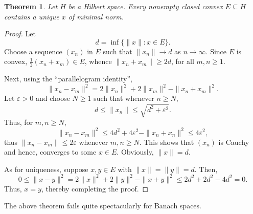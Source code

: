 \documentclass[12pt]{article}
\theoremstyle{thmstyle}
\newtheorem{theorem}{Theorem}[section]
\theoremstyle{defstyle}
\renewcommand{\le}{\leqslant}
\renewcommand{\ge}{\geqslant}
\begin{document}
\begin{theorem}
    Let $H$ be a Hilbert space. Every nonempty closed convex $E\subseteq H$ contains a unique $x$ of minimal norm.
\end{theorem}
\begin{proof}
    Let 
    \begin{equation*}
        d = \inf\{\|x\|\colon x\in E\}.
    \end{equation*}
    Choose a sequence $(x_n)$ in $E$ such that $\|x_n\|\to d$ as $n\to\infty$. Since $E$ is convex, $\frac{1}{2}(x_n + x_m)\in E$, whence $\|x_n + x_m\|\ge 2d$, for all $m,n\ge 1$.

    Next, using the ``parallelogram identity'', 
    \begin{equation*}
        \|x_n - x_m\|^2  = 2\|x_n\|^2 + 2\|x_m\|^2 - \|x_n + x_m\|^2.
    \end{equation*}
    Let $\varepsilon > 0$ and choose $N\ge 1$ such that whenever $n\ge N$, 
    \begin{equation*}
        d\le \|x_n\|\le\sqrt{d^2 + \varepsilon^2}.
    \end{equation*}
    Thus, for $m,n\ge N$, 
    \begin{equation*}
        \|x_n - x_m\|^2\le 4d^2 + 4\varepsilon^2 - \|x_n + x_n\|^2\le 4\varepsilon^2,
    \end{equation*}
    thus $\|x_n - x_m\|\le 2\varepsilon$ whenever $m,n\ge N$. This shows that $(x_n)$ is Cauchy and hence, converges to some $x\in E$. Obviously, $\|x\| = d$.

    As for uniqueness, suppose $x,y\in E$ with $\|x\| = \|y\| = d$. Then, 
    \begin{equation*}
        0\le \|x - y\|^2 = 2\|x\|^2 + 2\|y\|^2 - \|x + y\|^2\le 2d^2 + 2d^2 - 4d^2 = 0.
    \end{equation*}
    Thus, $x = y$, thereby completing the proof.
\end{proof}

The above theorem fails quite spectacularly for Banach spaces.
\end{document}
